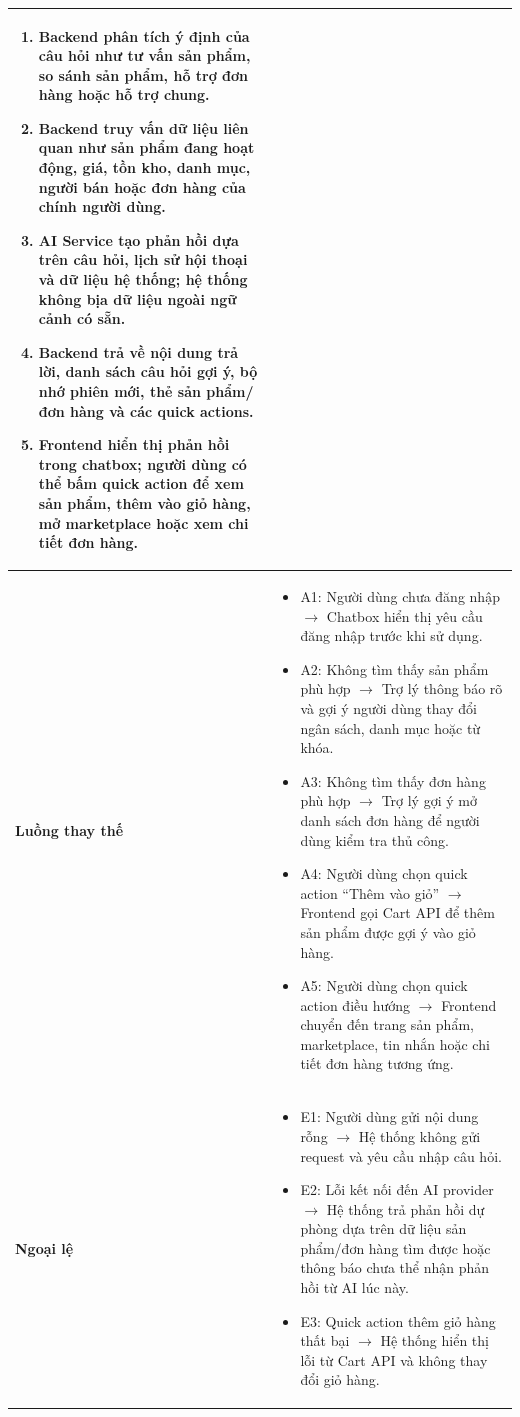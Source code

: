 \begin{longtable}{|p{3.5cm}|p{11cm}|}
\begin{enumerate}
    \item Backend phân tích ý định của câu hỏi như tư vấn sản phẩm, so sánh sản phẩm, hỗ trợ đơn hàng hoặc hỗ trợ chung.
    \item Backend truy vấn dữ liệu liên quan như sản phẩm đang hoạt động, giá, tồn kho, danh mục, người bán hoặc đơn hàng của chính người dùng.
    \item AI Service tạo phản hồi dựa trên câu hỏi, lịch sử hội thoại và dữ liệu hệ thống; hệ thống không bịa dữ liệu ngoài ngữ cảnh có sẵn.
    \item Backend trả về nội dung trả lời, danh sách câu hỏi gợi ý, bộ nhớ phiên mới, thẻ sản phẩm/đơn hàng và các quick actions.
    \item Frontend hiển thị phản hồi trong chatbox; người dùng có thể bấm quick action để xem sản phẩm, thêm vào giỏ hàng, mở marketplace hoặc xem chi tiết đơn hàng.
\end{enumerate} \\ \hline
\textbf{Luồng thay thế} & 
\begin{itemize}
    \item A1: Người dùng chưa đăng nhập $\rightarrow$ Chatbox hiển thị yêu cầu đăng nhập trước khi sử dụng.
    \item A2: Không tìm thấy sản phẩm phù hợp $\rightarrow$ Trợ lý thông báo rõ và gợi ý người dùng thay đổi ngân sách, danh mục hoặc từ khóa.
    \item A3: Không tìm thấy đơn hàng phù hợp $\rightarrow$ Trợ lý gợi ý mở danh sách đơn hàng để người dùng kiểm tra thủ công.
    \item A4: Người dùng chọn quick action ``Thêm vào giỏ'' $\rightarrow$ Frontend gọi Cart API để thêm sản phẩm được gợi ý vào giỏ hàng.
    \item A5: Người dùng chọn quick action điều hướng $\rightarrow$ Frontend chuyển đến trang sản phẩm, marketplace, tin nhắn hoặc chi tiết đơn hàng tương ứng.
\end{itemize} \\ \hline
\textbf{Ngoại lệ} & 
\begin{itemize}
    \item E1: Người dùng gửi nội dung rỗng $\rightarrow$ Hệ thống không gửi request và yêu cầu nhập câu hỏi.
    \item E2: Lỗi kết nối đến AI provider $\rightarrow$ Hệ thống trả phản hồi dự phòng dựa trên dữ liệu sản phẩm/đơn hàng tìm được hoặc thông báo chưa thể nhận phản hồi từ AI lúc này.
    \item E3: Quick action thêm giỏ hàng thất bại $\rightarrow$ Hệ thống hiển thị lỗi từ Cart API và không thay đổi giỏ hàng.

\end{itemize}
\end{longtable}
